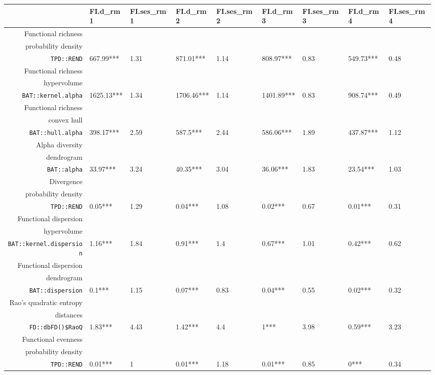 \begin{table}[ht]
\centering
\scriptsize
\begin{tabular}{rllllllll}
  \hline
 & FI.d\_rm1 & FI.ses\_rm1 & FI.d\_rm2 & FI.ses\_rm2 & FI.d\_rm3 & FI.ses\_rm3 & FI.d\_rm4 & FI.ses\_rm4 \\ 
  \hline
Functional richness\\ probability density\\ \texttt{TPD::REND} & 667.99*** & 1.31 & 871.01*** & 1.14 & 808.97*** & 0.83 & 549.73*** & 0.48 \\ 
  Functional richness\\ hypervolume\\ \texttt{BAT::kernel.alpha} & 1625.13*** & 1.34 & 1706.46*** & 1.14 & 1401.89*** & 0.83 & 908.74*** & 0.49 \\ 
  Functional richness\\ convex hull\\ \texttt{BAT::hull.alpha} & 398.17*** & 2.59 & 587.5*** & 2.44 & 586.06*** & 1.89 & 437.87*** & 1.12 \\ 
  Alpha diversity\\ dendrogram\\ \texttt{BAT::alpha} & 33.97*** & 3.24 & 40.35*** & 3.04 & 36.06*** & 1.83 & 23.54*** & 1.03 \\ 
  Divergence\\ probability density\\ \texttt{TPD::REND} & 0.05*** & 1.29 & 0.04*** & 1.08 & 0.02*** & 0.67 & 0.01*** & 0.31 \\ 
  Functional dispersion\\ hypervolume\\ \texttt{BAT::kernel.dispersion} & 1.16*** & 1.84 & 0.91*** & 1.4 & 0.67*** & 1.01 & 0.42*** & 0.62 \\ 
  Functional dispersion\\ dendrogram\\ \texttt{BAT::dispersion} & 0.1*** & 1.15 & 0.07*** & 0.83 & 0.04*** & 0.55 & 0.02*** & 0.32 \\ 
  Rao's quadratic entropy\\ distances\\ \texttt{FD::dbFD()\$RaoQ} & 1.83*** & 4.43 & 1.42*** & 4.4 & 1*** & 3.98 & 0.59*** & 3.23 \\ 
  Functional evenness\\ probability density\\ \texttt{TPD::REND} & 0.01*** & 1 & 0.01*** & 1.18 & 0.01*** & 0.85 & 0*** & 0.34 \\ 

\end{tabular}
\end{table}
